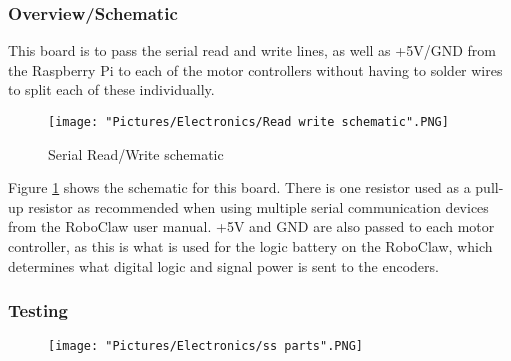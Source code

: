 \documentclass[12pt]{article}
\begin{document}
\subsubsection{Overview/Schematic}

This board is to pass the serial read and write lines, as well as +5V/GND from the Raspberry Pi to each of the motor controllers without having to solder wires to split each of these individually. 

\begin{figure}[H]
  	\centering
    	\texttt{[image: "Pictures/Electronics/Read write schematic".PNG]}
 	\caption{Serial Read/Write schematic}
	\label{rw sch}
\end{figure}

Figure \ref{rw sch} shows the schematic for this board. There is one resistor used as a pull-up resistor as recommended when using multiple serial communication devices from the RoboClaw user manual. +5V and GND are also passed to each motor controller, as this is what is used for the logic battery on the RoboClaw, which determines what digital logic and signal power is sent to the encoders. 

\subsubsection{Testing}

\begin{figure}[H]
  	\centering
    	\texttt{[image: "Pictures/Electronics/ss parts".PNG]}
\end{figure}
\end{document}
